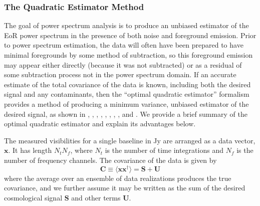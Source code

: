 \documentclass[preprint2,numberedappendix,tighten]{aastex6}  %
\begin{document}
\subsubsection{The Quadratic Estimator Method}
\label{sec:QE}


The goal of power spectrum analysis is to produce an unbiased estimator of the EoR power spectrum in the presence of both noise and foreground emission. Prior to power spectrum estimation, the data will often have been prepared to have minimal foregrounds by some method of subtraction, so this foreground emission may appear either directly (because it was not subtracted) or as a residual of some subtraction process not in the power spectrum domain. If an accurate estimate of the total covariance of the data is known, including both the desired signal and any contaminants, then the ``optimal quadratic estimator'' formalism provides a method of producing a minimum variance, unbiased estimator of the desired signal, as shown in 
\citet{liu_tegmark2011}, \citet{dillon_et_al2013a}, \citet{liu_et_al2014a}, \citet{liu_et_al2014b}, \citet{trott_et_al2012}, \citet{dillon_et_al2014}, \citet{dillon_et_al2015}, \citet{switzer_et_al2015}, and \citet{trott_et_al2016}. 
We provide a brief summary of the optimal quadratic estimator and explain its advantages below.

The measured visibilities for a single baseline in Jy are arranged as a data vector, $\textbf{x}$. It has length $N_{t} N_{f}$,
where $N_{t}$ is the number of time integrations and $N_{f}$ is the number of frequency channels. The covariance of the data is given by 
\begin{equation}
\textbf{C} \equiv \langle\textbf{xx}^{\dagger}\rangle = \textbf{S} + \textbf{U}
\end{equation}
where the average over an ensemble of data realizations produces the true covariance, and we further assume it may be written as the sum of the desired cosmological signal $\textbf{S}$ and other terms $\textbf{U}$.  
\end{document}
